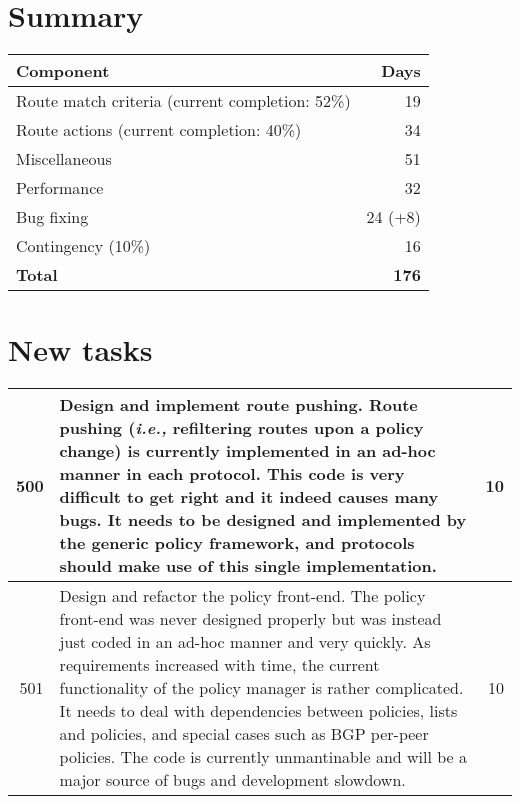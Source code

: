 \documentclass[letterpaper]{article}
\begin{document}
\section{Summary}
\begin{center}
\begin{tabular}{|l |r|}
\hline
Component	& Days \\
\hline
Route match criteria (current completion: 52\%)	& 19 \\
Route actions (current completion: 40\%)	& 34 \\
\hline
Miscellaneous		& 51 \\
Performance		& 32 \\
\hline
Bug fixing		& 24 (+8) \\
\hline
Contingency (10\%)	& 16 \\
\hline
\hline
{\bf Total}		& {\bf 176} \\
\hline

\end{tabular}
\end{center}

\section{New tasks}
\begin{center}
\tabletail{
\hline
}
\begin{supertabular}{|r |p{12cm} |r|}
\hline

500 &
Design and implement route pushing.  Route pushing ({\em i.e.,} refiltering
routes upon a policy change) is currently implemented in an ad-hoc manner in
each protocol.  This code is very difficult to get right and it indeed causes
many bugs.  It needs to be designed and implemented by the generic policy
framework, and protocols should make use of this single implementation.
& 10 \\
\hline

501 &
Design and refactor the policy front-end.  The policy front-end was never
designed properly but was instead just coded in an ad-hoc manner and very
quickly.  As requirements increased with time, the current functionality of the
policy manager is rather complicated.  It needs to deal with dependencies
between policies, lists and policies, and special cases such as BGP per-peer
policies.  The code is currently unmantinable and will be a major source of bugs
and development slowdown.
& 10 \\

\end{supertabular}
\end{center}
\end{document}
